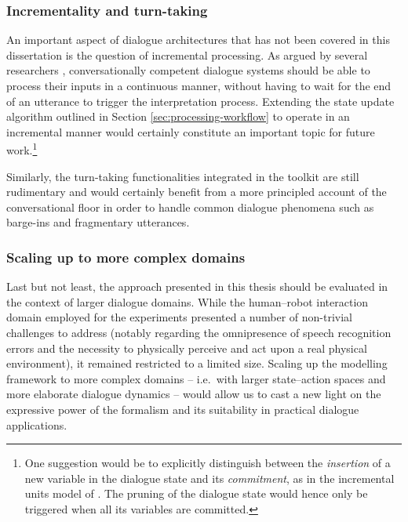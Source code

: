 \subsubsection*{Incrementality and turn-taking}

An important aspect of dialogue architectures that has not been covered in this dissertation is the question of incremental processing. As argued by several researchers \citep[see for instance][]{schlangen2009general}, conversationally competent dialogue systems should be able to process their inputs in a continuous manner, without having to wait for the end of an utterance to trigger the interpretation process.  Extending the state update algorithm outlined in Section \ref{sec:processing-workflow} to operate in an incremental manner would certainly constitute an important topic for future work.\footnote{One suggestion would be to explicitly distinguish between the \textit{insertion} of a new variable in the dialogue state and its \textit{commitment}, as in the incremental units model of \cite{schlangen2009general}.  The pruning of the dialogue state would hence only be triggered when all its variables are committed.}

Similarly, the turn-taking  functionalities integrated in the \opendial{} toolkit are still rudimentary and would certainly benefit from a more principled account of the conversational floor in order to handle common dialogue phenomena such as barge-ins and fragmentary utterances. 

\subsubsection*{Scaling up to more complex domains}

Last but not least, the approach presented in this thesis should be evaluated in the context of larger dialogue domains. While the human--robot interaction domain employed for the experiments presented a number of non-trivial challenges to address (notably regarding the omnipresence of speech recognition errors and the necessity to physically perceive and act upon a real physical environment), it remained restricted to a limited size. Scaling up the modelling framework to more complex domains -- i.e.\ with larger state--action spaces and more elaborate dialogue dynamics -- would allow us to cast a new light on the expressive power of the formalism and its suitability in practical dialogue applications. 

